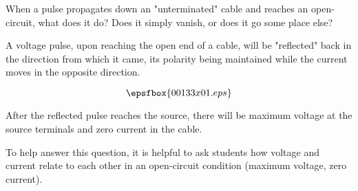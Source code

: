 

When a pulse propagates down an "unterminated" cable and reaches an open-circuit, what does it do?  Does it simply vanish, or does it go some place else?







A voltage pulse, upon reaching the open end of a cable, will be "reflected" back in the direction from which it came, its polarity being maintained while the current moves in the opposite direction.

$$\epsfbox{00133x01.eps}$$

After the reflected pulse reaches the source, there will be maximum voltage at the source terminals and zero current in the cable.







To help answer this question, it is helpful to ask students how voltage and current relate to each other in an open-circuit condition (maximum voltage, zero current).





